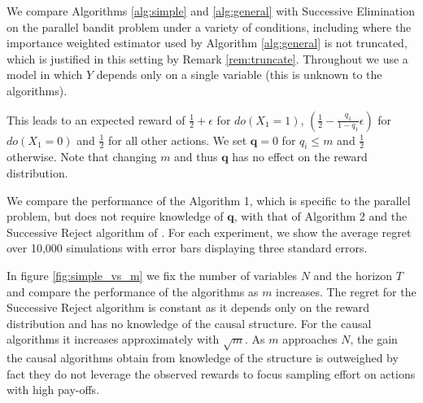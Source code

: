 We compare Algorithms \ref{alg:simple} and \ref{alg:general} with Successive Elimination on the parallel bandit problem
under a variety of conditions, including where the importance weighted estimator used by Algorithm \ref{alg:general} is not truncated,
which is justified in this setting by Remark \ref{rem:truncate}. Throughout we use a model in which $Y$ depends only on a single variable (this is unknown to the algorithms). 

This leads to an expected reward of $\frac{1}{2}+\epsilon$ for $do(X_1=1)$, $\left(\frac{1}{2}-\frac{q_1}{1-q_1}\epsilon\right)$ for $do(X_1=0)$ and $\frac{1}{2}$ for all other actions. We set $\boldsymbol{q} = 0$ for $q_i \leq m$ and $\frac{1}{2}$ otherwise. Note that changing $m$ and thus $\boldsymbol{q}$ has no effect on the reward distribution. 

We compare the performance of the Algorithm 1, which is specific to the parallel problem, but does not require knowledge of $\boldsymbol{q}$, with that of Algorithm 2 and the Successive Reject algorithm of \cite{audibert2010best}. For each experiment, we show the average regret over 10,000 simulations with error bars displaying three standard errors.

In figure \ref{fig:simple_vs_m} we fix the number of variables $N$ and the horizon $T$ and compare the performance of the algorithms as $m$ increases. The regret for the Successive Reject algorithm is constant as it depends only on the reward distribution and has no knowledge of the causal structure. For the causal algorithms it increases approximately with $\sqrt{m}$. As $m$ approaches $N$, the gain the causal algorithms obtain from knowledge of the structure is outweighed by fact they do not leverage the observed rewards to focus sampling effort on actions with high pay-offs.

